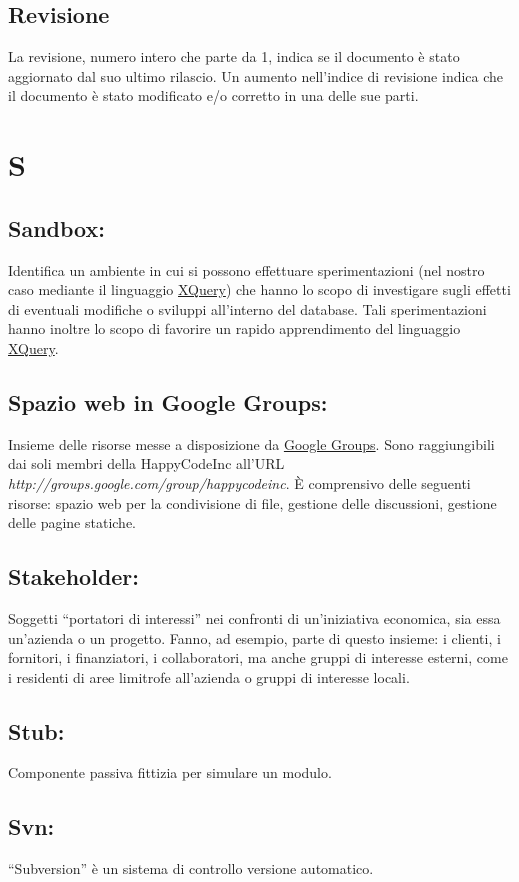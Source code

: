 \section{Revisione}
La revisione, numero intero che parte da 1, indica se il documento \`e stato aggiornato dal suo ultimo rilascio. Un aumento nell'indice di revisione indica che il documento \`e stato modificato e/o corretto in una delle sue parti.

\chapter{S}
\section{Sandbox:}
Identifica un ambiente in cui si possono effettuare sperimentazioni (nel nostro caso mediante il linguaggio \hyperlink{XQuery}{XQuery}) che hanno lo scopo di investigare sugli effetti di eventuali modifiche o sviluppi all'interno del database. Tali sperimentazioni hanno inoltre lo scopo di favorire un rapido apprendimento del linguaggio \hyperlink{XQuery}{XQuery}.

\hypertarget{Spazio web in Google Groups}{}
\section{Spazio web in Google Groups:}
Insieme delle risorse messe a disposizione da \hyperlink{Google Groups}{Google Groups}. Sono raggiungibili dai soli membri della HappyCodeInc all'URL\\ \textit{http://groups.google.com/group/happycodeinc}. \`E comprensivo delle seguenti risorse: spazio web per la condivisione di file, gestione delle discussioni, gestione delle pagine statiche.
\section{Stakeholder:}
Soggetti ``portatori di interessi'' nei confronti di un'iniziativa economica, sia essa un'azienda o un progetto. Fanno, ad esempio, parte di questo insieme: i clienti, i fornitori, i finanziatori, i collaboratori, ma anche gruppi di interesse esterni, come i residenti di aree limitrofe all'azienda o gruppi di interesse locali.
\section{Stub:}
Componente passiva fittizia per simulare un modulo.
\section{Svn:}
``Subversion'' \`e un sistema di controllo versione automatico. 


